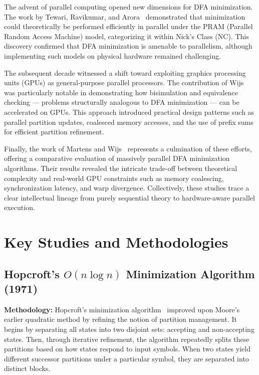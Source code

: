 The advent of parallel computing opened new dimensions for DFA minimization. The work by Tewari, Ravikumar, and Arora~\cite{tewari2002} demonstrated that minimization could theoretically be performed efficiently in parallel under the PRAM (Parallel Random Access Machine) model, categorizing it within Nick’s Class (NC). This discovery confirmed that DFA minimization is amenable to parallelism, although implementing such models on physical hardware remained challenging.

The subsequent decade witnessed a shift toward exploiting graphics processing units (GPUs) as general-purpose parallel processors. The contribution of Wijs~\cite{wijs2015} was particularly notable in demonstrating how bisimulation and equivalence checking — problems structurally analogous to DFA minimization — can be accelerated on GPUs. This approach introduced practical design patterns such as parallel partition updates, coalesced memory accesses, and the use of prefix sums for efficient partition refinement.

Finally, the work of Martens and Wijs~\cite{martenswijs2024} represents a culmination of these efforts, offering a comparative evaluation of massively parallel DFA minimization algorithms. Their results revealed the intricate trade-off between theoretical complexity and real-world GPU constraints such as memory coalescing, synchronization latency, and warp divergence. Collectively, these studies trace a clear intellectual lineage from purely sequential theory to hardware-aware parallel execution.

\section{Key Studies and Methodologies}

\subsection{Hopcroft's $O(n\log n)$ Minimization Algorithm (1971)}

\textbf{Methodology:}
Hopcroft’s minimization algorithm~\cite{hopcroft1971} improved upon Moore’s earlier quadratic method by refining the notion of partition management. It begins by separating all states into two disjoint sets: accepting and non-accepting states. Then, through iterative refinement, the algorithm repeatedly splits these partitions based on how states respond to input symbols. When two states yield different successor partitions under a particular symbol, they are separated into distinct blocks.

